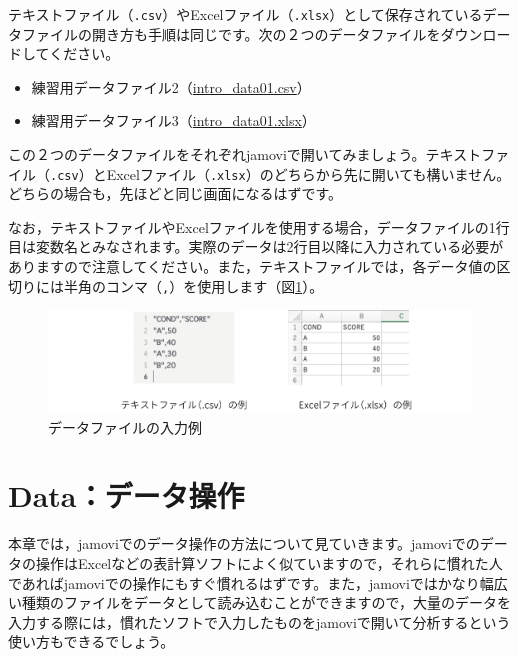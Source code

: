 \documentclass[
  12pt,
  a5jpaper,
  lualatex, ja=standard]{bxjsbook}
\begin{document}
テキストファイル（\texttt{.csv}）やExcelファイル（\texttt{.xlsx}）として保存されているデータファイルの開き方も手順は同じです。次の２つのデータファイルをダウンロードしてください。

\begin{itemize}
\item
  練習用データファイル2（\href{https://github.com/sbtseiji/jmv_compguide/raw/main/data/csv/intro_data01.csv}{intro\_data01.csv}）
\item
  練習用データファイル3（\href{https://github.com/sbtseiji/jmv_compguide/raw/main/data/xlsx/intro_data01.xlsx}{intro\_data01.xlsx}）
\end{itemize}

この２つのデータファイルをそれぞれjamoviで開いてみましょう。テキストファイル（\texttt{.csv}）とExcelファイル（\texttt{.xlsx}）のどちらから先に開いても構いません。どちらの場合も，先ほどと同じ画面になるはずです。

なお，テキストファイルやExcelファイルを使用する場合，データファイルの1行目は変数名とみなされます。実際のデータは2行目以降に入力されている必要がありますので注意してください。また，テキストファイルでは，各データ値の区切りには半角のコンマ（\texttt{,}）を使用します（図\ref{fig:file-exercise-example}）。

\begin{figure}[!ht]

{\centering \includegraphics[width=1\linewidth]{images/intro/exercise-example} 

}

\caption{データファイルの入力例}\label{fig:file-exercise-example}
\end{figure}

\hypertarget{ch:basics}{%
\chapter{Data：データ操作}\label{ch:basics}}

本章では，jamoviでのデータ操作の方法について見ていきます。jamoviでのデータの操作はExcelなどの表計算ソフトによく似ていますので，それらに慣れた人であればjamoviでの操作にもすぐ慣れるはずです。また，jamoviではかなり幅広い種類のファイルをデータとして読み込むことができますので，大量のデータを入力する際には，慣れたソフトで入力したものをjamoviで開いて分析するという使い方もできるでしょう。
\end{document}
